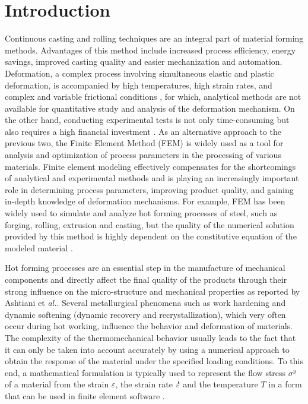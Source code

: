 \documentclass[twoside,english,1p,final,sort&compress]{elsarticle}
\makeatletter
\theoremstyle{plain}
\DeclareRobustCommand{\mdot}[1]{\accentset{\mbox{\bfseries .}}{#1}}
\DeclareRobustCommand{\eal}{et \emph{al.}\@\xspace}
\makeatother
\begin{document}
\section{Introduction\label{sec:Introduction}}

Continuous casting and rolling techniques are an integral part of material forming methods.
Advantages of this method include increased process efficiency, energy savings, improved casting quality and easier mechanization and automation.
Deformation, a complex process involving simultaneous elastic and plastic deformation, is accompanied by high temperatures, high strain rates, and complex and variable frictional conditions \cite{He-2013}, for which, analytical methods are not available for quantitative study and analysis of the deformation mechanism.
On the other hand, conducting experimental tests is not only time-consuming but also requires a high financial investment \cite{Changizian-2012}.
As an alternative approach to the previous two, the Finite Element Method (FEM) is widely used as a tool for analysis and optimization of process parameters in the processing of various materials.
Finite element modeling effectively compensates for the shortcomings of analytical and experimental methods and is playing an increasingly important role in determining process parameters, improving product quality, and gaining in-depth knowledge of deformation mechanisms.
For example, FEM has been widely used to simulate and analyze hot forming processes of steel, such as forging, rolling, extrusion and casting, but the quality of the numerical solution provided by this method is highly dependent on the constitutive equation of the modeled material \cite{Mandal-2009, Qin-2010, Ji-2018}.

Hot forming processes are an essential step in the manufacture of mechanical components and directly affect the final quality of the products through their strong influence on the micro-structure and mechanical properties as reported by Ashtiani \eal \cite{Ashtiani-2012}.
Several metallurgical phenomena such as work hardening and dynamic softening (dynamic recovery and recrystallization), which very often occur during hot working, influence the behavior and deformation of materials.
The complexity of the thermomechanical behavior usually leads to the fact that it can only be taken into account accurately by using a numerical approach to obtain the response of the material under the specified loading conditions.
To this end, a mathematical formulation is typically used to represent the flow stress $\sigma^y$ of a material from the strain $\varepsilon$, the strain rate $\mdot\varepsilon$ and the temperature $T$ in a form that can be used in finite element software \cite{Lin-2008-P, Wu-2012}.
\end{document}
